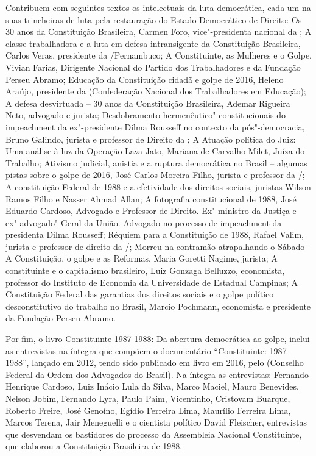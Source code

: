 Contribuem com seguintes textos os intelectuais da luta democrática, cada um na suas trincheiras de luta pela restauração do Estado Democrático de Direito: Os 30 anos da Constituição Brasileira, Carmen Foro, vice"-presidenta nacional da ; A classe trabalhadora e a luta em defesa intransigente da Constituição Brasileira, Carlos Veras, presidente da /Pernambuco; A Constituinte, as Mulheres e o Golpe, Vivian Farias, Dirigente Nacional do Partido dos Trabalhadores e da Fundação Perseu Abramo; Educação da Constituição cidadã e golpe de 2016, Heleno Araújo, presidente da  (Confederação Nacional dos Trabalhadores em Educação); A defesa desvirtuada – 30 anos da Constituição Brasileira, Ademar Rigueira Neto, advogado e jurista; Desdobramento hermenêutico"-constitucionais do impeachment da ex"-presidente Dilma Rousseff no contexto da pós"-democracia, Bruno Galindo, jurista e professor de Direito da ; A Atuação política do Juiz: Uma análise à luz da Operação Lava Jato, Mariana de Carvalho Milet, Juíza do Trabalho; Ativismo judicial, anistia e a ruptura democrática no Brasil – algumas pistas sobre o golpe de 2016, José Carlos Moreira Filho, jurista e professor da /;  A constituição  Federal de 1988 e a efetividade dos direitos sociais,  juristas Wilson Ramos Filho e Nasser Ahmad Allan;  A fotografia constitucional de 1988, José Eduardo Cardoso, Advogado e Professor de Direito. Ex"-ministro da Justiça e ex"-advogado"-Geral da União. Advogado no processo de impeachment da presidenta Dilma Rousseff; Réquiem para a Constituição de 1988, Rafael Valim, jurista e professor de direito da /; Morreu na contramão atrapalhando o Sábado - A Constituição, o golpe e as Reformas, Maria Goretti Nagime, jurista; A constituinte e o capitalismo brasileiro, Luiz Gonzaga Belluzzo, economista, professor do Instituto de Economia da Universidade de Estadual Campinas; A Constituição Federal das garantias dos direitos sociais e o golpe político desconstitutivo do trabalho no Brasil, Marcio Pochmann, economista e presidente da Fundação Perseu Abramo.

Por fim, o livro Constituinte 1987-1988: Da abertura democrática ao golpe, inclui as entrevistas na íntegra que compõem o documentário “Constituinte: 1987-1988”, lançado em 2012, tendo sido publicado em livro em 2016, pelo  (Conselho Federal da Ordem dos Advogados do Brasil). Na íntegra as entrevistas: Fernando Henrique Cardoso, Luiz Inácio Lula da Silva, Marco Maciel, Mauro Benevides, Nelson Jobim, Fernando Lyra, Paulo Paim, Vicentinho, Cristovam Buarque, Roberto Freire, José Genoíno, Egídio Ferreira Lima, Maurílio Ferreira Lima, Marcos Terena, Jair Meneguelli e o cientista político David Fleischer, entrevistas que desvendam os bastidores do processo da Assembleia Nacional Constituinte, que elaborou a Constituição Brasileira de 1988.

